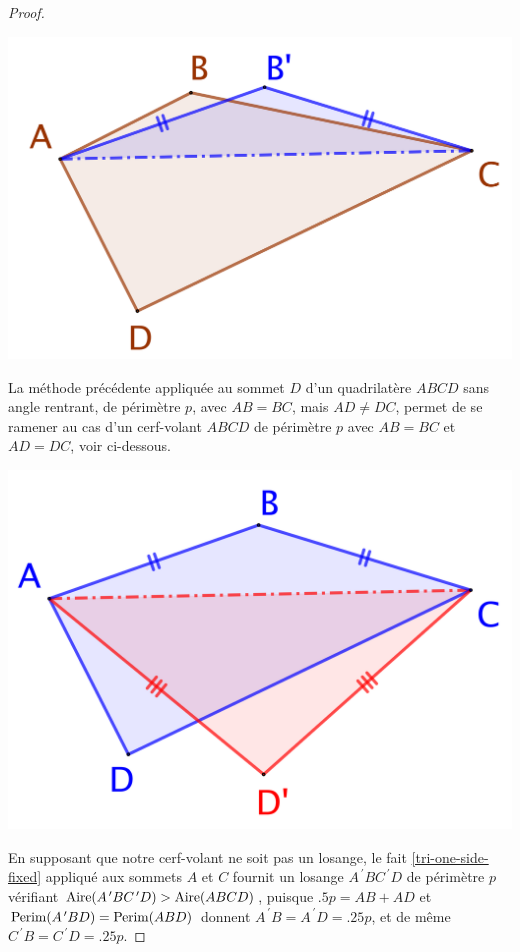 \begin{proof}
	\begin{center}
		\includegraphics[scale=.4]{content/quadrilateral/gene/convex-gene.png}
	\end{center}
	
	
	La méthode précédente appliquée au sommet $D$ d'un quadrilatère $ABCD$ sans angle rentrant, de périmètre $p$, avec $AB = BC$, mais $AD \neq DC$, permet de se ramener au cas d'un cerf-volant $ABCD$ de périmètre $p$ avec $AB = BC$ et $AD = DC$, voir ci-dessous. 

	\begin{center}
		\includegraphics[scale=.4]{content/quadrilateral/gene/convex-one-paire.png}
	\end{center}
	
	
	En supposant que notre cerf-volant ne soit pas un losange, le fait \ref{tri-one-side-fixed} appliqué aux sommets $A$ et $C$ fournit un losange $A^{\,\prime}BC^{\,\prime}D$ de périmètre $p$ vérifiant $\mathrm{Aire}(A^{\,\prime}BC^{\,\prime}D) > \mathrm{Aire}(ABCD)$, 
	puisque
	$\num{.5} p = AB + AD$
	et
	$\mathrm{Perim}(A^{\,\prime}BD) = \mathrm{Perim}(ABD)$
	donnent
	$A^{\,\prime}B = A^{\,\prime}D = \num{.25} p$,
	et de même
	$C^{\,\prime}B = C^{\,\prime}D = \num{.25} p$.


\end{proof}
